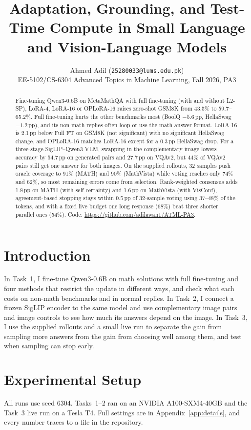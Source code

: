 \documentclass{article}
\title{Adaptation, Grounding, and Test-Time Compute in Small Language and Vision-Language Models}
\author{%
  Ahmed Adil (\texttt{25280033@lums.edu.pk}) \\
  EE-5102/CS-6304 Advanced Topics in Machine Learning, Fall 2026, PA3
}
\newcommand{\pp}{\,pp}
\begin{document}
\maketitle

\begin{abstract}
Fine-tuning Qwen3-0.6B on MetaMathQA with full fine-tuning (with and without L2-SP), LoRA-4, LoRA-16 or OPLoRA-16 raises zero-shot GSM8K from 43.5\% to 59.7--65.2\%. Full fine-tuning hurts the other benchmarks most (BoolQ $-5.6$\pp, HellaSwag $-1.2$\pp), and its non-math replies often loop or use the math answer format. LoRA-16 is 2.1\pp{} below Full FT on GSM8K (not significant) with no significant HellaSwag change, and OPLoRA-16 matches LoRA-16 except for a 0.3\pp{} HellaSwag drop. For a three-stage SigLIP--Qwen3 VLM, swapping in the complementary image lowers accuracy by 54.7\pp{} on generated pairs and 27.7\pp{} on VQAv2, but 44\% of VQAv2 pairs still get one answer for both images. On the supplied rollouts, 32 samples push oracle coverage to 91\% (MATH) and 90\% (MathVista) while voting reaches only 74\% and 62\%, so most remaining errors come from selection. Rank-weighted consensus adds 1.8\pp{} on MATH (with self-certainty) and 1.6\pp{} on MathVista (with VisConf), agreement-based stopping stays within 0.5\pp{} of 32-sample voting using 37--48\% of the tokens, and with a fixed live budget one long response (68\%) beat three shorter parallel ones (54\%).
Code: \url{https://github.com/adilawan1/ATML-PA3}.
\end{abstract}

\section{Introduction}
In Task~1, I fine-tune Qwen3-0.6B on math solutions with full fine-tuning and four methods that restrict the update in different ways, and check what each costs on non-math benchmarks and in normal replies. In Task~2, I connect a frozen SigLIP encoder to the same model and use complementary image pairs and image controls to see how much its answers depend on the image. In Task~3, I use the supplied rollouts and a small live run to separate the gain from sampling more answers from the gain from choosing well among them, and test when sampling can stop early.

\section{Experimental Setup}
All runs use seed 6304. Tasks~1--2 ran on an NVIDIA A100-SXM4-40GB and the Task~3 live run on a Tesla T4. Full settings are in Appendix~\ref{app:details}, and every number traces to a file in the repository.
\end{document}
